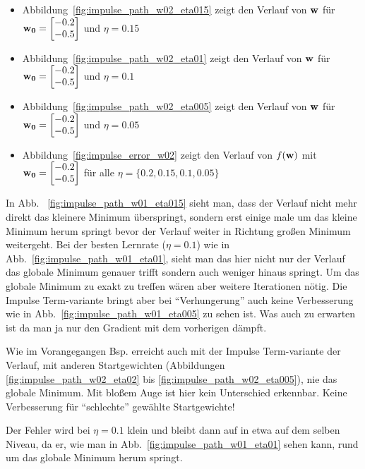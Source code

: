 \begin{itemize}
  \item Abbildung~\ref{fig:impulse_path_w02_eta015} zeigt den Verlauf von $\mathbf{w}$ für $\mathbf{w_0} = \begin{bmatrix} -0.2 \\ -0.5 \end{bmatrix}$ und $\eta = 0.15$
  \item Abbildung~\ref{fig:impulse_path_w02_eta01} zeigt den Verlauf von $\mathbf{w}$ für $\mathbf{w_0} = \begin{bmatrix} -0.2 \\ -0.5 \end{bmatrix}$ und $\eta = 0.1$
  \item Abbildung~\ref{fig:impulse_path_w02_eta005} zeigt den Verlauf von $\mathbf{w}$ für $\mathbf{w_0} = \begin{bmatrix} -0.2 \\ -0.5 \end{bmatrix}$ und $\eta = 0.05$
  \item Abbildung~\ref{fig:impulse_error_w02} zeigt den Verlauf von $f(\mathbf{w})$ mit $\mathbf{w_0} = \begin{bmatrix} -0.2 \\ -0.5 \end{bmatrix}$ für alle $\eta = \{0.2, 0.15, 0.1, 0.05\}$
\end{itemize}

In Abb. ~\ref{fig:impulse_path_w01_eta015} sieht man, dass der Verlauf nicht mehr direkt das kleinere Minimum überspringt, sondern erst einige male um das kleine Minimum herum springt bevor der Verlauf weiter in Richtung großen Minimum weitergeht. Bei der besten Lernrate ($\eta =0.1$) wie in Abb.~\ref{fig:impulse_path_w01_eta01}, sieht man das hier nicht nur der Verlauf das globale Minimum genauer trifft sondern auch weniger hinaus springt. Um das globale Minimum zu exakt zu treffen wären aber weitere Iterationen nötig. Die Impulse Term-variante  bringt aber bei ``Verhungerung'' auch keine Verbesserung wie in Abb.~\ref{fig:impulse_path_w01_eta005} zu sehen ist. Was auch zu erwarten ist da man ja nur den Gradient mit dem vorherigen dämpft.

Wie im Vorangegangen Bsp. erreicht auch mit der Impulse Term-variante der Verlauf, mit anderen Startgewichten (Abbildungen \ref{fig:impulse_path_w02_eta02} bis \ref{fig:impulse_path_w02_eta005}), nie das globale Minimum. Mit bloßem Auge ist hier kein Unterschied erkennbar. Keine Verbesserung für ``schlechte'' gewählte Startgewichte!

Der Fehler wird bei $\eta = 0.1$ klein und bleibt dann auf in etwa  auf dem selben Niveau, da er, wie man in Abb.~\ref{fig:impulse_path_w01_eta01} sehen kann, rund um das globale Minimum herum springt.





